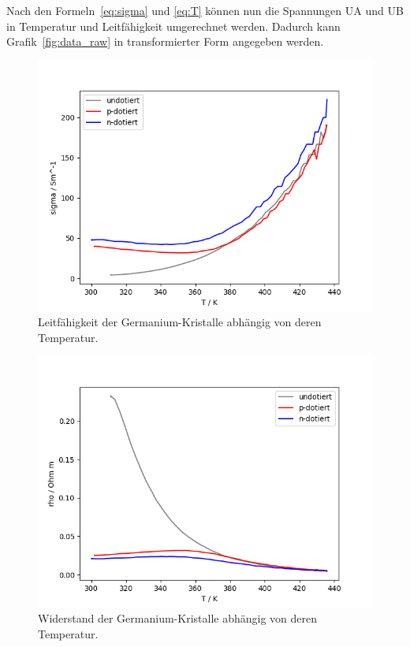 \documentclass{article}
\begin{document}
Nach den Formeln~\eqref{eq:sigma} und \eqref{eq:T} können nun die Spannungen UA und UB in Temperatur und Leitfähigkeit umgerechnet werden. Dadurch kann Grafik~\ref{fig:data_raw} in transformierter Form angegeben werden.

\begin{figure}[H]
\includegraphics[scale=1.]{leitfaehigkeit.png}
\caption{Leitfähigkeit der Germanium-Kristalle abhängig von deren Temperatur.}
\label{fig:leitfaehigkeit}
\end{figure}


\begin{figure}[H]
\includegraphics[scale=1.]{widerstand.png}
\caption{Widerstand der Germanium-Kristalle abhängig von deren Temperatur.}
\label{fig:leitfaehigkeit}
\end{figure}
\end{document}
